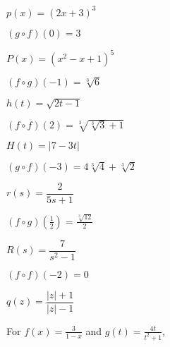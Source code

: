 \documentclass{ximera}
\begin{document}
\begin{question}
$p(x) = (2x+3)^3$
\begin{solution}
$(g\circ f)(0) = 3$
\end{solution}

\end{question}

\begin{question}
$P(x) = \left(x^2-x+1\right)^5$

\begin{solution}
$(f\circ g)(-1) = \sqrt[3]{6}$
\end{solution}

\end{question}

\begin{question}
$h(t) = \sqrt{2t-1}$
\begin{solution}
$(f \circ f)(2) = \sqrt[3]{\sqrt[3]{3}+1}$








\end{solution}

\end{question}

\begin{question}
$H(t) = |7-3t|$

\begin{solution}
$(g\circ f)(-3) = 4\sqrt[3]{4}+\sqrt[3]{2}$
\end{solution}

\end{question}

\begin{question}
$r(s) = \dfrac{2}{5s+1}$
\begin{solution}
$(f\circ g)\left(\frac{1}{2}\right) = \frac{\sqrt[3]{12}}{2}$
\end{solution}

\end{question}

\begin{question}
$R(s) = \dfrac{7}{s^2-1}$

\begin{solution}
$(f \circ f)(-2) = 0$


\end{solution}

\end{question}

\begin{question}
$q(z) = \dfrac{|z|+1}{|z|-1}$
\begin{solution}
For  $f(x) = \frac{3}{1-x}$ and $g(t) = \frac{4t}{t^2+1}$,



\end{solution}

\end{question}
\end{document}
